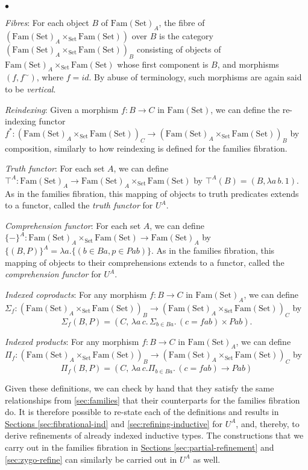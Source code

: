 \documentclass{LMCS}
\newcommand{\Fam}{\mathrm{Fam}}
\newcommand{\Set}{\mathrm{Set}}
\begin{document}
\begin{iteMize}{$\bullet$}
\item {\em Fibres}: For each object $B$ of $\Fam(\Set)_A$, the fibre
  of $(\Fam(\Set)_A \times_{\Set} \Fam(\Set))$ over $B$ is the
  category $(\Fam(\Set)_A \times_{\Set} \Fam(\Set))_B$ consisting of
  objects of $\Fam(\Set)_A \times_{\Set} \Fam(\Set)$ whose first
  component is $B$, and morphisms $(f,f^{\sim})$, where $f =
  \mathit{id}$. By abuse of terminology, such morphisms are again said
  to be \emph{vertical}.
\item {\em Reindexing}: Given a morphism $f : B \to C$ in
  $\Fam(\Set)$, we can define the re-indexing functor $f^* :
  (\Fam(\Set)_A \times_{\Set} \Fam(\Set))_C \to (\Fam(\Set)_A
  \times_{\Set} \Fam(\Set))_B$ by composition, similarly to how
  reindexing is defined for the families fibration.
\item {\em Truth functor}: For each set $A$, we can define $\top^A :
  \Fam(\Set)_A \to \Fam(\Set)_A \times_{\Set} \Fam(\Set)$ by
  $\top^A(B) = (B, \lambda a\, b.\, 1)$. As in the families fibration,
  this mapping of objects to truth predicates extends to a functor,
  called the {\em truth functor} for $U^A$.
\item {\em Comprehension functor}: For each set $A$, we can define
  $\{-\}^A : \Fam(\Set)_A \times_{\Set} \Fam(\Set) \to \Fam(\Set)_A$
  by $\{(B,P)\}^A = \lambda a. \{ (b \in Ba, p \in P a b)\}$. As in
  the families fibration, this mapping of objects to their
  comprehensions extends to a functor, called the {\em comprehension
    functor} for $U^A$.
\item {\em Indexed coproducts}: For any morphism $f : B \to C$ in
  $\Fam(\Set)_A$, we can define $\Sigma_f : (\Fam(\Set)_A
  \times_{\Set} \Fam(\Set))_B \to (\Fam(\Set)_A \times_{\Set}
  \Fam(\Set))_C$ by
  \begin{displaymath}
    \Sigma_f (B,P) = (C,\, \lambda a\, c.\, \Sigma_{b \in Ba}.\, (c = f a
    b) \times P a b). 
  \end{displaymath}
\item {\em Indexed products}: For any morphism $f : B \to C$ in
  $\Fam(\Set)_A$, we can define $\Pi_f : (\Fam(\Set)_A \times_{\Set}
  \Fam(\Set))_B \to (\Fam(\Set)_A \times_{\Set} \Fam(\Set))_C$ by
  \begin{displaymath}
    \Pi_f (B,P) = (C,\, \lambda a\, c. \Pi_{b \in Ba}.\, (c = f a b) \to P a b)
  \end{displaymath}
\end{iteMize}
\noindent
Given these definitions, we can check by hand that they satisfy the
same relationships from \autoref{sec:families} that their counterparts
for the families fibration do. It is therefore possible to re-state
each of the definitions and results in
\hyperref[sec:fibrational-ind]{Sections \ref*{sec:fibrational-ind}}
and \hyperref[sec:refining-inductive]{ \ref*{sec:refining-inductive}}
for $U^A$, and, thereby, to derive refinements of already indexed
inductive types. The constructions that we carry out in the families
fibration in \hyperref[sec:partial-refinement]{Sections
  \ref*{sec:partial-refinement}} and \hyperref[sec:zygo-refine]{
  \ref*{sec:zygo-refine}} can similarly be carried out in $U^A$ as
well.
\end{document}
